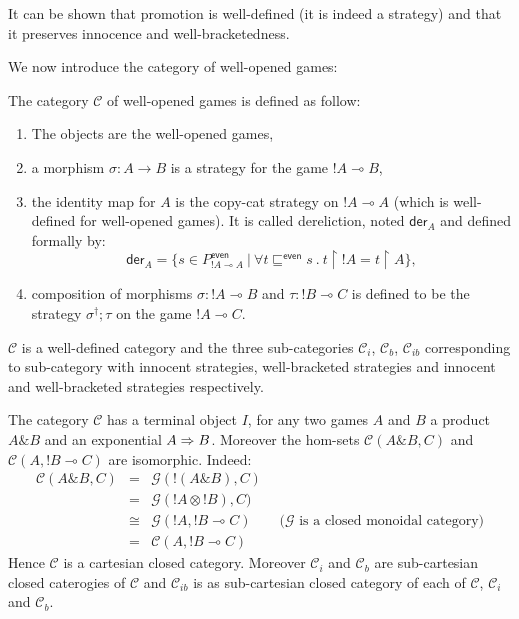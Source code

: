 It can be shown that promotion is well-defined (it is indeed a strategy) and that it preserves innocence and
well-bracketedness.


We now introduce the category of well-opened games:
\begin{dfn}
The category $\mathcal{C}$ of well-opened games is defined as follow:
\begin{enumerate}
\item The objects are the well-opened games,
\item a morphism $\sigma : A \rightarrow B$ is a strategy for the game $!A \multimap B$,
\item the identity map for $A$ is the copy-cat strategy on $!A \multimap A$ (which is well-defined for well-opened games).
It is called dereliction, noted
$\textsf{der}_A$ and defined formally by:
$$ \textsf{der}_A = \{ s \in P^{\textsf{even}}_{{!A} \multimap A} \ | \ \forall t \sqsubseteq^{\textsf{even}} s \ . \ t \upharpoonright {!A} = t \upharpoonright A \},$$
\item composition of morphisms $\sigma : {!A} \multimap B$ and $\tau : {!B} \multimap C$ is defined to be
the strategy $\sigma^\dagger;\tau$ on the game ${!A} \multimap C$.
\end{enumerate}
\end{dfn}
$\mathcal{C}$ is a well-defined category and the three sub-categories
$\mathcal{C}_i$, $\mathcal{C}_b$, $\mathcal{C}_{ib}$ corresponding to sub-category
with innocent strategies, well-bracketed strategies and innocent and well-bracketed strategies respectively.


The category $\mathcal{C}$ has a terminal object $I$, for any two games $A$ and $B$ a product $A \& B$ and
an exponential $A \Rightarrow B$. Moreover the hom-sets $\mathcal{C}(A \& B,C)$ and
$\mathcal{C}(A,!B \multimap C)$ are isomorphic. Indeed:
\begin{eqnarray*}
\mathcal{C}(A\& B,C) &=& \mathcal{G}(!(A\& B),C) \\
&=& \mathcal{G}({!A}\otimes {!B}),C) \\
&\cong& \mathcal{G}({!A}, {!B} \multimap C) \qquad  \mbox{($\mathcal{G}$ is a closed monoidal category)}\\
&=& \mathcal{C}(A, {!B} \multimap C)
\end{eqnarray*}
Hence $\mathcal{C}$ is a cartesian closed category. Moreover $\mathcal{C}_i$ and $\mathcal{C}_b$
are sub-cartesian closed caterogies of $\mathcal{C}$ and $\mathcal{C}_{ib}$ is as sub-cartesian closed category
of each of $\mathcal{C}$, $\mathcal{C}_i$ and $\mathcal{C}_b$.



